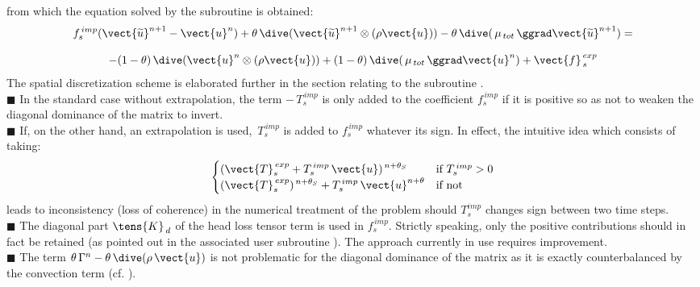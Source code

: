 from which the equation solved by the subroutine  is obtained:
\begin{equation}\begin{array}{c}
\displaystyle
f_s^{\,imp}(\vect {\widetilde{u}}^{n+1}-\vect {u}^{n}) + \theta\, \dive(\vect{\widetilde{u}}^{n+1} \otimes (\rho
\vect{u})) - \theta\,\dive (\,\mu_{\,tot}\,\ggrad \vect{\widetilde{u}}^{n+1}) =
\\\\
\displaystyle
-(1-\theta)\,\dive(\vect{u}^{n} \otimes (\rho \vect{u}))+(1-\theta)\,\dive (\,\mu_{\,tot}\,\ggrad \vect{u}^{n})
+ \vect{f}_{\,s}^{\,exp}
\end{array}
\end{equation}
The spatial discretization scheme is elaborated further in the section relating to the subroutine .\\



{\tiny$\blacksquare$} In the standard case without extrapolation, the term
$-\,T_s^{\,imp}$ is only added to the coefficient $f_s^{\,imp}$ if it is positive so as not to weaken
the diagonal dominance of the matrix to invert.\\
{\tiny$\blacksquare$} If, on the other hand, an extrapolation is used,
$\,T_s^{\,imp}$ is added to $f_s^{\,imp}$ whatever its sign. In effect, the intuitive idea which consists of taking:
\begin{equation}
\begin{cases}
\displaystyle
(\vect{T}_{s}^{\,exp} + T_{s}^{\,imp}\,\vect {u})^{\,n+\theta_S} &
\text{if } T_{s}^{\,imp} > 0\\
\displaystyle
(\vect{T}_{s}^{\,exp})^{\,n+\theta_S} + T_{s}^{\,imp}\,\vect{u}^{n+\theta} &\text{if not}\\
\end{cases}
\end{equation}
leads to inconsistency (loss of coherence) in the numerical treatment of the problem should $T_s^{imp}$ changes sign between two time steps.\\
{\tiny$\blacksquare$} The diagonal part $\tens{K}_{\,d}$ of the head loss tensor term is used in $f_s^{\,imp}$. Strictly speaking, only the positive contributions should in fact be retained (as pointed out in the associated user subroutine ). The  approach currently in use requires improvement.\\
{\tiny$\blacksquare$} The term $\theta\,\Gamma^{n}-\theta\,\dive
(\rho\,\vect {u})$ is not problematic for the diagonal dominance of the matrix as it is exactly counterbalanced by the convection term (cf. ).

